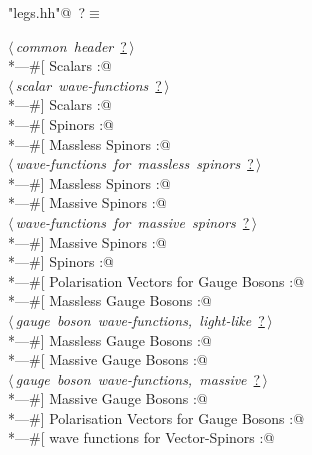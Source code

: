 \documentclass[a4paper,12pt]{amsart}
\renewcommand{\NWtarget}[2]{\hypertarget{#1}{#2}}
\renewcommand{\NWlink}[2]{\hyperlink{#1}{#2}}
\begin{document}
\begin{flushleft} \small\label{scrap2}\raggedright\small
\NWtarget{nuweb?}{} \verb@"legs.hh"@\nobreak\ {\footnotesize {?}}$\equiv$
\vspace{-1ex}
\begin{list}{}{} \item
\mbox{}\verb@@\hbox{$\langle\,${\it common header}\nobreak\ {\footnotesize \NWlink{nuweb?}{?}}$\,\rangle$}\verb@@\\
\mbox{}\verb@*---#[ Scalars :@\\
\mbox{}\verb@@\hbox{$\langle\,${\it scalar wave-functions}\nobreak\ {\footnotesize \NWlink{nuweb?}{?}}$\,\rangle$}\verb@@\\
\mbox{}\verb@*---#] Scalars :@\\
\mbox{}\verb@*---#[ Spinors :@\\
\mbox{}\verb@*---#[   Massless Spinors :@\\
\mbox{}\verb@@\hbox{$\langle\,${\it wave-functions for massless spinors}\nobreak\ {\footnotesize \NWlink{nuweb?}{?}}$\,\rangle$}\verb@@\\
\mbox{}\verb@*---#]   Massless Spinors :@\\
\mbox{}\verb@*---#[   Massive Spinors :@\\
\mbox{}\verb@@\hbox{$\langle\,${\it wave-functions for massive spinors}\nobreak\ {\footnotesize \NWlink{nuweb?}{?}}$\,\rangle$}\verb@@\\
\mbox{}\verb@*---#]   Massive Spinors :@\\
\mbox{}\verb@*---#] Spinors :@\\
\mbox{}\verb@*---#[ Polarisation Vectors for Gauge Bosons :@\\
\mbox{}\verb@*---#[    Massless Gauge Bosons :@\\
\mbox{}\verb@@\hbox{$\langle\,${\it gauge boson wave-functions, light-like}\nobreak\ {\footnotesize \NWlink{nuweb?}{?}}$\,\rangle$}\verb@@\\
\mbox{}\verb@*---#]    Massless Gauge Bosons :@\\
\mbox{}\verb@*---#[    Massive Gauge Bosons :@\\
\mbox{}\verb@@\hbox{$\langle\,${\it gauge boson wave-functions, massive}\nobreak\ {\footnotesize \NWlink{nuweb?}{?}}$\,\rangle$}\verb@@\\
\mbox{}\verb@*---#]    Massive Gauge Bosons :@\\
\mbox{}\verb@*---#] Polarisation Vectors for Gauge Bosons :@\\
\mbox{}\verb@*---#[ wave functions for Vector-Spinors :@\\

\end{list}
\end{flushleft}
\end{document}
